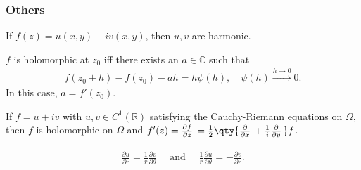 \hypertarget{others}{%
\subsubsection{Others}\label{others}}

\begin{theorem}

If \(f(z) = u(x, y) + iv(x, y)\), then \(u, v\) are harmonic.

\end{theorem}

\begin{theorem}

\(f\) is holomorphic at \(z_0\) iff there exists an
\(a\in {\mathbb{C}}\) such that
\begin{align*}  
f(z_0 + h) - f(z_0) - ah = h \psi(h), \quad \psi(h) \overset{h\to 0}\to 0
.\end{align*}
In this case, \(a = f'(z_0)\).

\end{theorem}

\begin{proposition}

If \(f = u+iv\) with \(u, v\in C^1({\mathbb{R}})\) satisfying the
Cauchy-Riemann equations on \(\Omega\), then \(f\) is holomorphic on
\(\Omega\) and
\(f'(z) = {\frac{\partial f}{\partial z}\,} = {1 \over 2} \qty{{\frac{\partial }{\partial x}\,} + {1\over i} {\frac{\partial }{\partial y}\,}}f\).

\end{proposition}

\begin{proposition}

\begin{align*}  
\frac{\partial u}{\partial r}=\frac{1}{r} \frac{\partial v}{\partial \theta} \quad \text { and } \quad \frac{1}{r} \frac{\partial u}{\partial \theta}=-\frac{\partial v}{\partial r}
.\end{align*}

\end{proposition}


